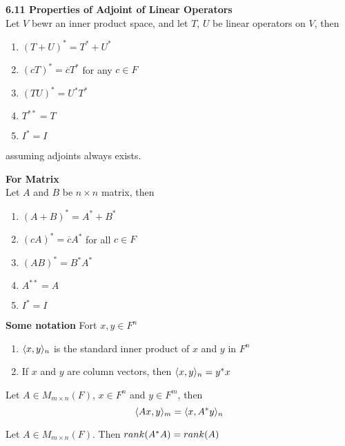 \documentclass[11pt]{article}
\begin{document}
\begin{theorem*}
    \textbf{6.11 Properties of Adjoint of Linear Operators} \\
    Let $V$ bewr an inner product space, and let $T$, $U$ be linear operators on $V$, then 
    \begin{enumerate}
        \item $(T+U)^* = T^* + U^*$ 
        \item $(cT)^* = \overline{c}T^*$ for any $c\in F$
        \item $(TU)^* = U^*T^*$ 
        \item $T^{**} = T$ 
        \item $I^* = I$ 
    \end{enumerate}
    assuming adjoints always exists.
\end{theorem*}

\begin{corollary*}
    \textbf{For Matrix} \\
    Let $A$ and $B$ be $n\times n$ matrix, then 
    \begin{enumerate}
        \item $(A+B)^* = A^* + B^*$ 
        \item $(cA)^* = \overline{c}A^*$ for all $c\in F$
        \item $(AB)^* = B^*A^*$ 
        \item $A^{**} = A$ 
        \item $I^* = I$ 
    \end{enumerate}
\end{corollary*}


\begin{defn*}
    \textbf{Some notation} Fort $x,y\in F^n$ 
    \begin{enumerate}
        \item $\langle x,y\rangle_n$ is the standard inner product of $x$ and $y$  in $F^n$
        \item If $x$ and $y$ are column vectors, then $\langle x,y\rangle_n = y^*x$ 
    \end{enumerate}
\end{defn*}


\begin{lemma*}
    Let $A\in M_{m\times n}(F)$, $x\in F^n$ and $y\in F^m$, then 
    \[
        \langle Ax,y\rangle_m = \langle x,A^*y\rangle_n    
    \]
\end{lemma*}

\begin{lemma*}
    Let $A\in M_{m\times n}(F)$. Then $rank(A^*A)=rank(A)$
\end{lemma*}
\end{document}
